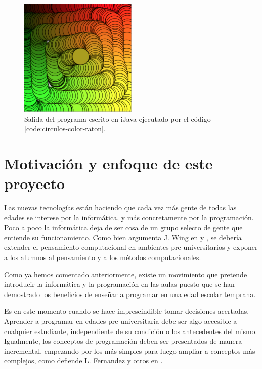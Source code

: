 \begin{figure}[!ht]
	\begin{centering}
		\includegraphics[width=0.5\textwidth]{images/salida-code-circulos-color-raton.png}
			\caption{Salida del programa escrito en iJava ejecutado por el código \ref{code:circulos-color-raton}.}
				\label{fig:salida-code-circulos-color-raton}
	\end{centering}
\end{figure}



\section{Motivación y enfoque de este proyecto}
\label{sec:motivacion}

Las nuevas tecnologías están haciendo que cada vez más gente de todas las edades se interese por la informática, y más concretamente por la programación. Poco a poco la informática deja de ser cosa de un grupo selecto de gente que entiende su funcionamiento. Como bien argumenta J. Wing en \cite{wing2006computational} y \cite{Wing3717}, se debería extender el pensamiento computacional en ambientes pre-universitarios y exponer a los alumnos al pensamiento y a los métodos computacionales.

Como ya hemos comentado anteriormente, existe un movimiento que pretende introducir la informática y la programación en las aulas puesto que se han demostrado los beneficios de enseñar a programar en una edad escolar temprana.

Es en este momento cuando se hace imprescindible tomar decisiones acertadas. Aprender a programar en edades pre-universitaria debe ser algo accesible a cualquier estudiante, independiente de su condición o los antecedentes del mismo. Igualmente, los conceptos de programación deben ser presentados de manera incremental, empezando por los más simples para luego ampliar a conceptos más complejos, como defiende L. Fernandez y otros en \cite{fernandez2002analisis}.

